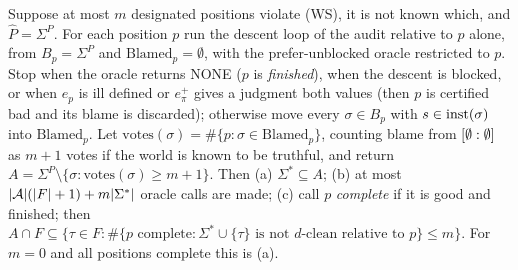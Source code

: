 \begin{proposition}\label{prop:twotier:voting}
Suppose at most $m$ designated positions violate (WS), it is not known which, and $\hat P=\Sigma^P$. For each position $p$ run the descent loop of the audit relative to $p$ alone, from $B_p=\Sigma^P$ and $\mathrm{Blamed}_p=\emptyset$, with the prefer-unblocked oracle restricted to $p$. Stop when the oracle returns NONE ($p$ is \emph{finished}), when the descent is blocked, or when $e_p$ is ill defined or $e^+_\pi$ gives a judgment both values (then $p$ is certified bad and its blame is discarded); otherwise move every $\sigma\in B_p$ with $s\in\mathrm{inst}(\sigma)$ into $\mathrm{Blamed}_p$. Let $\mathrm{votes}(\sigma)=\#\{p:\sigma\in\mathrm{Blamed}_p\}$, counting blame from $[\emptyset : \emptyset]$ as $m+1$ votes if the world is known to be truthful, and return $A=\Sigma^P\setminus\{\sigma:\mathrm{votes}(\sigma)\ge m+1\}$. Then
\textup{(a)} $\Sigma^*\subseteq A$;
\textup{(b)} at most $|\mathcal{A}|(|F|+1)+m|\Sigma^*|$ oracle calls are made;
\textup{(c)} call $p$ \emph{complete} if it is good and finished; then $A\cap F\subseteq\{\tau\in F:\#\{p\text{ complete}:\Sigma^*\cup\{\tau\}\text{ is not $d$-clean relative to }p\}\le m\}$. For $m=0$ and all positions complete this is (a).
\end{proposition}

